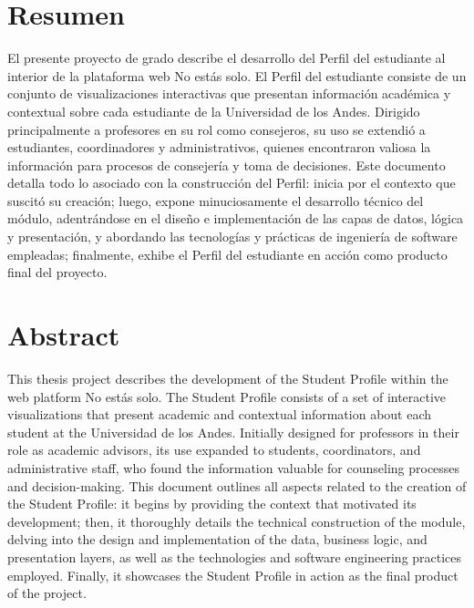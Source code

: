 \section*{\centering Resumen}

\begin{spacing}{1.5}
El presente proyecto de grado describe el desarrollo del Perfil del estudiante al interior de la plataforma web No estás solo. El Perfil del estudiante consiste de un conjunto de visualizaciones interactivas que presentan información académica y contextual sobre cada estudiante de la Universidad de los Andes. Dirigido principalmente a profesores en su rol como consejeros, su uso se extendió a estudiantes, coordinadores y administrativos, quienes encontraron valiosa la información para procesos de consejería y toma de decisiones. Este documento detalla todo lo asociado con la construcción del Perfil: inicia por el contexto que suscitó su creación; luego, expone minuciosamente el desarrollo técnico del módulo, adentrándose en el diseño e implementación de las capas de datos, lógica y presentación, y abordando las tecnologías y prácticas de ingeniería de software empleadas; finalmente, exhibe el Perfil del estudiante en acción como producto final del proyecto.
\end{spacing}

\section*{\centering Abstract}

\begin{spacing}{1.5}
This thesis project describes the development of the Student Profile within the web platform No estás solo. The Student Profile consists of a set of interactive visualizations that present academic and contextual information about each student at the Universidad de los Andes. Initially designed for professors in their role as academic advisors, its use expanded to students, coordinators, and administrative staff, who found the information valuable for counseling processes and decision-making. This document outlines all aspects related to the creation of the Student Profile: it begins by providing the context that motivated its development; then, it thoroughly details the technical construction of the module, delving into the design and implementation of the data, business logic, and presentation layers, as well as the technologies and software engineering practices employed. Finally, it showcases the Student Profile in action as the final product of the project.
\end{spacing}
